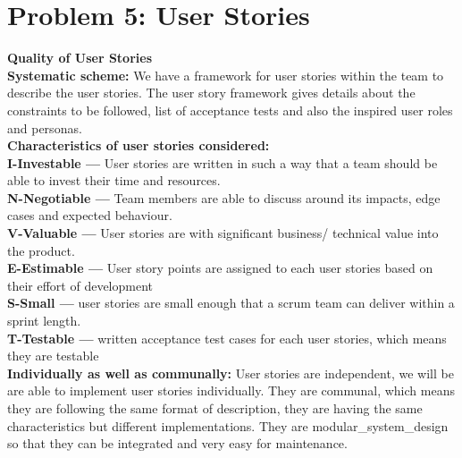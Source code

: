 \documentclass[a4paper,12pt]{report}
\begin{document}
\vspace{1cm}
\section{Problem 5: User Stories \cite{userstorieskamthan}}


\textbf{Quality of User Stories \cite{qualitykamthan}} \\

\textbf{Systematic scheme:} We have a framework for user stories within the team to describe the user stories. The user story framework gives details about the constraints to be followed, list of acceptance tests and also the inspired user roles and personas.\\


\textbf{Characteristics of user stories considered:} \\ 
\textbf{I-Investable —} User stories are written in such a way that a team should be able to invest their time and resources. \\
\textbf{N-Negotiable —} Team members are able to discuss around its impacts, edge cases and expected behaviour. \\
\textbf{V-Valuable —} User stories are with significant business/ technical value into the product. \\
\textbf{E-Estimable —} User story points are assigned to each user stories based on their effort of development \\
\textbf{S-Small —} user stories are small enough that a scrum team can deliver within a sprint length. \\
\textbf{T-Testable —} written acceptance test cases for each user stories, which means they are testable \\


\textbf{Individually as well as communally:} User stories are independent, we will be are able to implement user stories individually. They are communal, which means they are following the same format of description, they are having the same characteristics but different implementations. They are \gls{modular_system_design} so that they can be integrated and very easy for maintenance.







\setlength\arrayrulewidth{2pt}
\FloatBarrier


\end{document}
